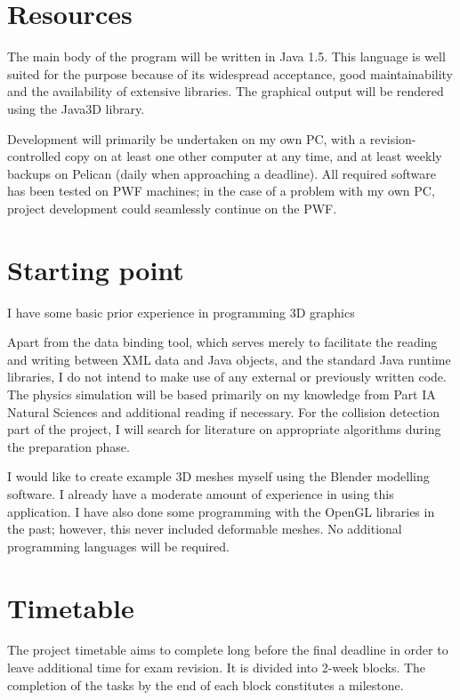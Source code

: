 \documentclass{article}
\begin{document}
\section*{Resources}

The main body of the program will be written in Java 1.5. This
language is well suited for the purpose because of its widespread
acceptance, good maintainability and the availability of extensive
libraries. The graphical output will be rendered using the Java3D
library.

Development will primarily be undertaken on my own PC, with a
revision-controlled copy on at least one other computer at any time,
and at least weekly backups on Pelican (daily when approaching a
deadline). All required software has been tested on PWF machines; in
the case of a problem with my own PC, project development could
seamlessly continue on the PWF.


\section*{Starting point}

I have some basic prior experience in programming 3D graphics


Apart from the data binding tool, which serves merely to facilitate
the reading and writing between XML data and Java objects, and the
standard Java runtime libraries, I do not intend to make use of any
external or previously written code. The physics simulation will be
based primarily on my knowledge from Part IA Natural Sciences and
additional reading if necessary. For the collision detection part
of the project, I will search for literature on appropriate algorithms
during the preparation phase.

I would like to create example 3D meshes myself using the Blender
modelling software. I already have a moderate amount of experience
in using this application. I have also done some programming with the
OpenGL libraries in the past; however, this never included deformable
meshes. No additional programming languages will be required.


\section{Timetable}

The project timetable aims to complete long before the final deadline
in order to leave additional time for exam revision. It is divided
into 2-week blocks. The completion of the tasks by the end of each
block constitutes a milestone.
\end{document}
